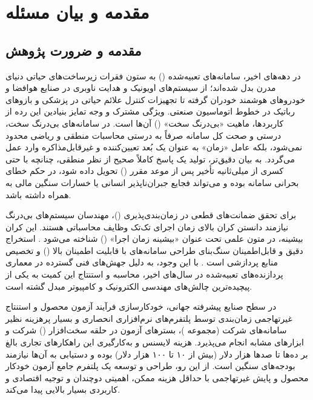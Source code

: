 
\chapter{مقدمه و بیان مسئله}
\label{ch:intro}

\section{مقدمه و ضرورت پژوهش}
در دهه‌های اخیر، سامانه‌های تعبیه‌شده () به ستون فقرات زیرساخت‌های حیاتی دنیای مدرن بدل شده‌اند؛ از سیستم‌های اویونیک و هدایت ناوبری در صنایع هوافضا و خودروهای هوشمند خودران گرفته تا تجهیزات کنترل علائم حیاتی در پزشکی و بازوهای رباتیک در خطوط اتوماسیون صنعتی. ویژگی مشترک و وجه تمایز بنیادین این رده از کاربردها، ماهیت «بی‌درنگ سخت» () آن‌ها است. در سامانه‌های بی‌درنگ سخت، درستی و صحت کل سامانه صرفاً به درستی محاسبات منطقی و ریاضی محدود نمی‌شود، بلکه عامل «زمان» به عنوان یک بُعد تعیین‌کننده و غیرقابل‌مذاکره وارد عمل می‌گردد. به بیان دقیق‌تر، تولید یک پاسخ کاملاً صحیح از نظر منطقی، چنانچه با حتی کسری از میلی‌ثانیه تأخیر پس از موعد مقرر () تحویل داده شود، در حکم خطای بحرانی سامانه بوده و می‌تواند فجایع جبران‌ناپذیر انسانی یا خسارات سنگین مالی به همراه داشته باشد.

برای تحقق ضمانت‌های قطعی در زمان‌بندی‌پذیری ()، مهندسان سیستم‌های بی‌درنگ نیازمند دانستن کران بالای زمان اجرای تک‌تک وظایف محاسباتی هستند. این کران بیشینه، در متون علمی تحت عنوان «بیشینه زمان اجرا» () شناخته می‌شود \cite{wilhelm2008worst}. استخراج دقیق و قابل‌اطمینان  سنگ‌بنای طراحی سامانه‌های با قابلیت اطمینان بالا () و تخصیص منابع پردازشی است \cite{kargahi2008analytical}. با این وجود، به دلیل جهش‌های فنی گسترده در معماری پردازنده‌های تعبیه‌شده در سال‌های اخیر، محاسبه و استنتاج این کمیت به یکی از پیچیده‌ترین چالش‌های مهندسی الکترونیک و کامپیوتر مبدل گشته است.

در سطح صنایع پیشرفته جهانی، خودکارسازی فرآیند آزمون محصول و استنتاج غیرتهاجمی زمان‌بندی توسط پلتفرم‌های نرم‌افزاری انحصاری و بسیار پرهزینه نظیر سامانه‌های شرکت  (مجموعه )، بسترهای آزمون در حلقه سخت‌افزار () شرکت  و ابزارهای مشابه انجام می‌پذیرد. هزینه لایسنس و به‌کارگیری این راهکارهای تجاری بالغ بر ده‌ها تا صدها هزار دلار (بیش از ۱۰ تا ۱۰۰ هزار دلار) بوده و دستیابی به آن‌ها نیازمند بودجه‌های سنگین است. از این رو، طراحی و توسعه یک پلتفرم جامع آزمون خودکار محصول و پایش غیرتهاجمی با حداقل هزینه ممکن، اهمیتی دوچندان و توجیه اقتصادی و کاربردی بسیار بالایی پیدا می‌کند.

